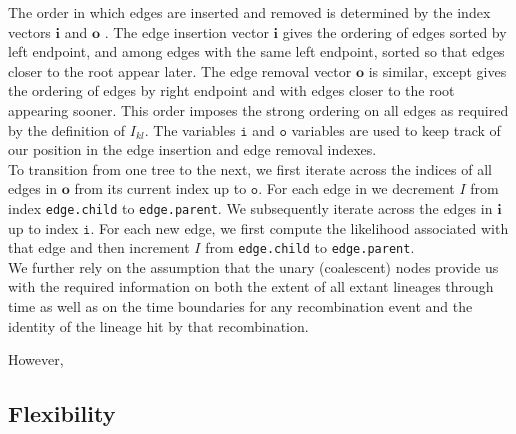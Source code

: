 \documentclass{article}
\begin{document}
The order in which edges are inserted and removed is determined by the index 
vectors $\textbf{i}$ and $\textbf{o}$ \citep{kelleher_efficient_2016}. The edge insertion vector 
$\textbf{i}$ gives the ordering of edges sorted by left endpoint, and among edges 
with the same left endpoint, sorted so that edges closer to the root appear later. 
The edge removal vector $\textbf{o}$ is similar, except gives the ordering of edges 
by right endpoint and with edges closer to the root appearing sooner. This order imposes the 
strong ordering on all edges as required by the definition of $I_{kl}$. The variables $\texttt{i}$ and 
$\texttt{o}$ variables are used to keep track of our position in the edge insertion and edge removal 
indexes.\\

To transition from one tree to the next, we first iterate across the indices of all edges 
in $\textbf{o}$ from its current index up to $\texttt{o}$. For each edge in we decrement $I$ 
from index \texttt{edge.child} to \texttt{edge.parent}. We subsequently iterate across the 
edges in $\textbf{i}$ up to index $\texttt{i}$. For each new edge, we first compute the likelihood 
associated with that edge and then 
increment $I$ from \texttt{edge.child} to \texttt{edge.parent}.\\

We further rely on the assumption that the unary (coalescent) nodes 
provide us with the required information on both the extent of all extant lineages through 
time as well as on the time boundaries for any recombination event and the identity of the 
lineage hit by that recombination.

However, 





\subsection{Flexibility}
\end{document}
